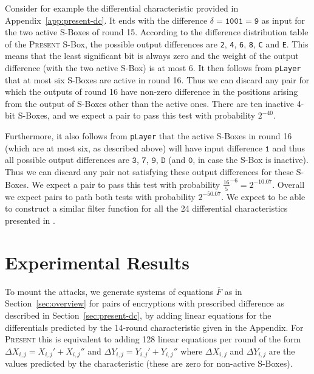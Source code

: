 \documentclass{llncs}
\newcommand{\PRESENT}{\textsc{Present}\xspace}
\begin{document}
Consider for example the differential characteristic provided
in Appendix~\ref{app:present-dc}. It ends with the difference $\delta =
\texttt{1001} = \texttt{9}$ as input for the two active S-Boxes of round 15.
According to the difference distribution table of the \PRESENT S-Box, the
possible output differences are \texttt{2}, \texttt{4}, \texttt{6}, \texttt{8},
\texttt{C} and \texttt{E}. This means that the least significant bit is always
zero and the weight of the output difference (with the two active S-Box) is
at most 6. It then follows from \texttt{pLayer} that at most six
S-Boxes are active in round 16. Thus we can discard any pair for which the
outputs of round 16 have non-zero difference in the positions arising from the
output of S-Boxes other than the active ones. There are ten inactive
4-bit S-Boxes, and we expect a pair to pass this test with probability
$2^{-40}$.

Furthermore, it also follows from \texttt{pLayer} that the active
S-Boxes in round 16 (which are at most six, as described above) will have input
difference $\texttt{1}$ and thus all possible output differences are
$\texttt{3}$, $\texttt{7}$, $\texttt{9}$, $\texttt{D}$ (and $\texttt{0}$, in
case the S-Box is inactive). Thus we can discard any pair not satisfying these
output differences for these S-Boxes. We expect a pair to pass this test with
probability $\frac{16}{5}^{-6} = 2^{-10.07}$. Overall we expect pairs to
path both tests with probability $2^{-50.07}$.
We expect to be able to construct a similar filter function for all the 24
differential characteristics presented in \cite{present-differentials}.

\section{Experimental Results}
\label{sec:present-adc}

To mount the attacks, we generate systems of equations $\overline{F}$ as in
Section~\ref{sec:overview} for pairs of encryptions with prescribed difference
as described in Section~\ref{sec:present-dc},
by adding linear equations for the differentials
predicted by the 14-round characteristic given in the Appendix. For \PRESENT
this is equivalent to adding 128 linear equations per round of the form $\Delta
X_{i,j} = X_{i,j}' + X_{i,j}''$ and $\Delta Y_{i,j} = Y_{i,j}' + Y_{i,j}''$
where $\Delta X_{i,j}$ and $\Delta Y_{i,j}$ are the values predicted by the
characteristic (these are zero for non-active S-Boxes).
\end{document}
